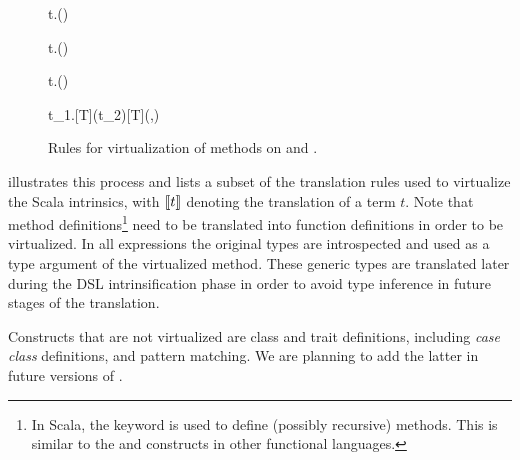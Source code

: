 \begin{figure}
\begin{multicols}{2}
   \infyyax{}
     {t.}{()}
\end{multicols}

\begin{multicols}{2}
   \infyyax{}
     {t.}{()}

   \infyyax{}
     {t.}{()}

\end{multicols}

  \infyyax{}
     {t_1.[T](t_2)}{[T](,\;)}

\caption{Rules for virtualization of methods on  and .}
\label{fig:virt-any}
\end{figure}



  illustrates this process and 
lists a subset of the translation rules used to virtualize the Scala intrinsics,
with $\llbracket t \rrbracket$ denoting the translation of a term $t$. Note that method
definitions\footnote{In Scala, the  keyword is used to define
(possibly recursive) methods. This is similar to the  and 
 constructs in other functional languages.} need to be translated into
function definitions in order to be virtualized. In all expressions the original
types are introspected and used as a type argument of the virtualized method.
These generic types are translated later during the DSL intrinsification phase
in order to avoid type inference in future stages of the translation.

Constructs that are not virtualized are class and trait definitions, including
 \emph{case class} definitions, and pattern matching. We are planning to add the
 latter in future versions of \tool.

